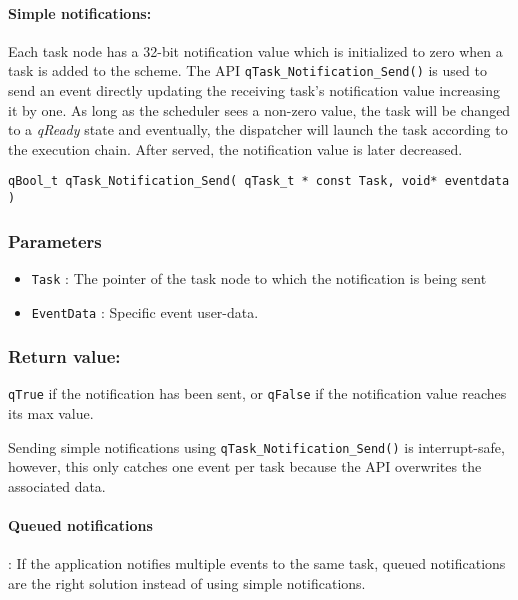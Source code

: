 

\paragraph{Simple notifications:}
Each task node has a 32-bit notification value which is initialized to zero when a task is added to the scheme. The API \lstinline{qTask_Notification_Send()}  is used to send an event directly updating the receiving task's notification value increasing it by one. As long as the scheduler sees a non-zero value, the task will be changed to a \textit{qReady} state and eventually, the dispatcher will launch the task according to the execution chain. After served, the notification value is later decreased.
\medskip

\begin{lstlisting}[style=CStyle]
qBool_t qTask_Notification_Send( qTask_t * const Task, void* eventdata )
\end{lstlisting}

\subsubsection*{Parameters}
\begin{itemize}
    \item \lstinline{Task} : The pointer of the task node to which the notification is being sent 
    \item \lstinline{EventData} : Specific event user-data. 
\end{itemize}

\subsubsection*{Return value:}

\lstinline{qTrue} if the notification  has been sent, or \lstinline{qFalse} if the notification value reaches its max value. 

\begin{tcolorbox}
\HandRight Sending simple notifications using \lstinline{qTask_Notification_Send()} is interrupt-safe, however, this only catches one event per task because the API overwrites the associated data.
\end{tcolorbox}

\paragraph{Queued notifications}
 : If the application notifies multiple events to the same task, queued notifications are the right solution instead of using simple notifications.

